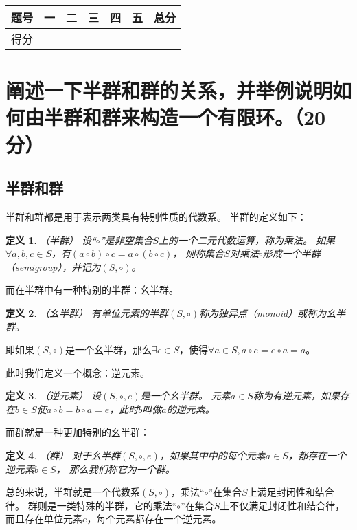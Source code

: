 \documentclass[12pt,onecolumn]{article}
\theoremstyle{plain}
\newtheorem{definition}{定义}[section]
\begin{document}
\clearpage

\begin{table*}[h]
 \vspace{2\baselineskip}
 \xiaosi
 \begin{tabular}{|c|c|c|c|c|c|c|}
 \hline
 题号 & 一 & 二 & 三 & 四 & 五 & 总分 \\
 \hline
 得分 &    &    &    &    &    &      \\
 \hline
 \end{tabular}
\end{table*}

\section{阐述一下半群和群的关系，并举例说明如何由半群和群来构造一个有限环。（20分）}

\subsection{半群和群}
半群和群都是用于表示两类具有特别性质的代数系。
半群的定义如下：
\begin{definition}{（半群）}
 设“$\circ$”是非空集合$S$上的一个二元代数运算，称为乘法。
 如果$\forall a, b, c \in S$，有$(a \circ b) \circ c = a \circ (b \circ c)$，
 则称集合$S$对乘法$\circ$形成一个半群（semigroup），并记为$(S, \circ)$。
\end{definition}

而在半群中有一种特别的半群：幺半群。
\begin{definition}{（幺半群）}
 有单位元素的半群$(S, \circ)$称为独异点（monoid）或称为幺半群。
\end{definition}
即如果$(S, \circ)$是一个幺半群，那么$\exists e \in S$，使得$\forall a \in S, a \circ e = e \circ a = a$。

此时我们定义一个概念：逆元素。
\begin{definition}{（逆元素）}
 设$(S, \circ, e)$是一个幺半群。
 元素$a \in S$称为有逆元素，如果存在$b \in S$使$a \circ b = b \circ a = e$，此时$b$叫做$a$的逆元素。
\end{definition}
而群就是一种更加特别的幺半群：
\begin{definition}{（群）}
 对于幺半群$(S, \circ, e)$，如果其中中的每个元素$a \in S$，都存在一个逆元素$b \in S$，
 那么我们称它为一个群。
\end{definition}

总的来说，半群就是一个代数系$(S, \circ)$，乘法“$\circ$”在集合$S$上满足封闭性和结合律。
群则是一类特殊的半群，它的乘法“$\circ$”在集合$S$上不仅满足封闭性和结合律，
而且存在单位元素$e$，每个元素都存在一个逆元素。
\end{document}
